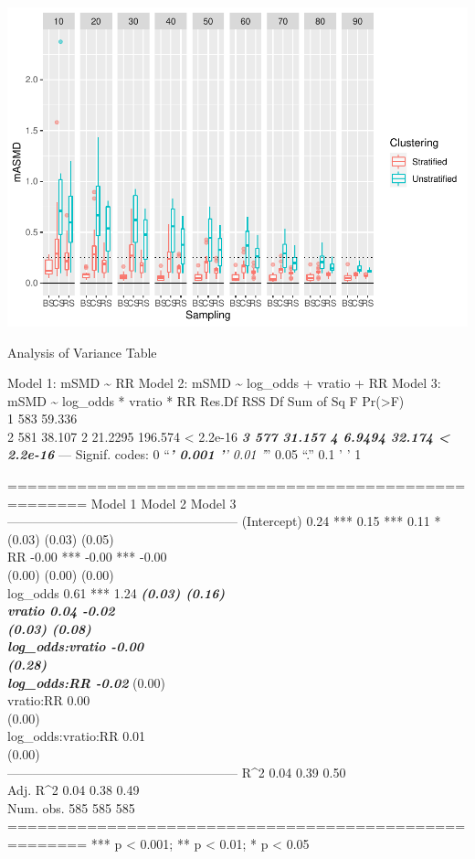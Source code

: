 \documentclass[
  english,
  man,floatsintext]{apa6}
\begin{document}
\includegraphics{5---Analysis_files/figure-latex/unnamed-chunk-21-1.pdf}

Analysis of Variance Table

Model 1: mSMD \textasciitilde{} RR
Model 2: mSMD \textasciitilde{} log\_odds + vratio + RR
Model 3: mSMD \textasciitilde{} log\_odds * vratio * RR
Res.Df RSS Df Sum of Sq F Pr(\textgreater F)\\
1 583 59.336\\
2 581 38.107 2 21.2295 196.574 \textless{} 2.2e-16 \textbf{\emph{
3 577 31.157 4 6.9494 32.174 \textless{} 2.2e-16 }}
---
Signif. codes: 0 \enquote{\emph{\textbf{' 0.001 '}' 0.01 '}} 0.05 \enquote{.} 0.1 ' ' 1

======================================================
Model 1 Model 2 Model 3\\
------------------------------------------------------
(Intercept) 0.24 *** 0.15 *** 0.11 *\\
(0.03) (0.03) (0.05)\\
RR -0.00 *** -0.00 *** -0.00\\
(0.00) (0.00) (0.00)\\
log\_odds 0.61 *** 1.24 \textbf{\emph{
(0.03) (0.16)\\
vratio 0.04 -0.02\\
(0.03) (0.08)\\
log\_odds:vratio -0.00\\
(0.28)\\
log\_odds:RR -0.02 }}
(0.00)\\
vratio:RR 0.00\\
(0.00)\\
log\_odds:vratio:RR 0.01\\
(0.00)\\
------------------------------------------------------
R\^{}2 0.04 0.39 0.50\\
Adj. R\^{}2 0.04 0.38 0.49\\
Num. obs. 585 585 585\\
======================================================
*** p \textless{} 0.001; ** p \textless{} 0.01; * p \textless{} 0.05
\end{document}
